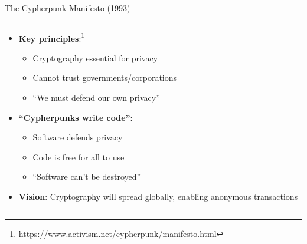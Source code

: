 \documentclass[aspectratio=169, lualatex, handout]{beamer}
\begin{document}
\begin{frame}{The Cypherpunk Manifesto (1993)}
	\begin{columns}[c]
		\begin{column}{1\textwidth}
			\begin{itemize}[<+->]
				\item \textbf{Key principles}:\footnote{\url{https://www.activism.net/cypherpunk/manifesto.html}}
				      \begin{itemize}
					      \item Cryptography essential for privacy
					      \item Cannot trust governments/corporations
					      \item ``We must defend our own privacy''
				      \end{itemize}
				\item \textbf{``Cypherpunks write code''}:
				      \begin{itemize}
					      \item Software defends privacy
					      \item Code is free for all to use
					      \item ``Software can't be destroyed''
				      \end{itemize}
				\item \textbf{Vision}: Cryptography will spread globally, enabling anonymous transactions
			\end{itemize}
		\end{column}
	\end{columns}
\end{frame}
\end{document}
